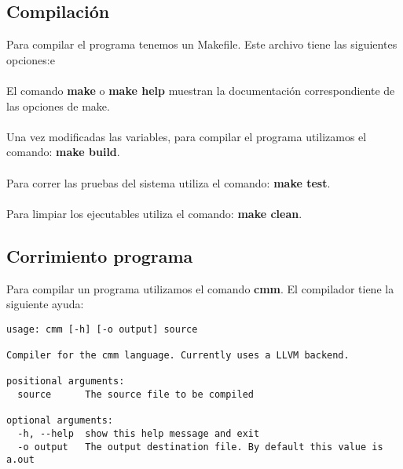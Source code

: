 \documentclass[11pt]{article}
\begin{document}
\subsection{Compilación}

Para compilar el programa tenemos un Makefile. Este archivo tiene las siguientes opciones:e
\\\\
El comando \textbf{make} o \textbf{make help} muestran la documentación correspondiente de las opciones de make.
\\\\
Una vez modificadas las variables, para compilar el programa utilizamos el comando: \textbf{make build}.
\\\\
Para correr las pruebas del sistema utiliza el comando: \textbf{make test}.
\\\\
Para limpiar los ejecutables utiliza el comando: \textbf{make clean}.

\subsection{Corrimiento programa}

Para compilar un programa utilizamos el comando \textbf{cmm}. El compilador tiene la siguiente ayuda:
 
\begin{verbatim}
usage: cmm [-h] [-o output] source

Compiler for the cmm language. Currently uses a LLVM backend.

positional arguments:
  source      The source file to be compiled

optional arguments:
  -h, --help  show this help message and exit
  -o output   The output destination file. By default this value is a.out
\end{verbatim}
\end{document}
